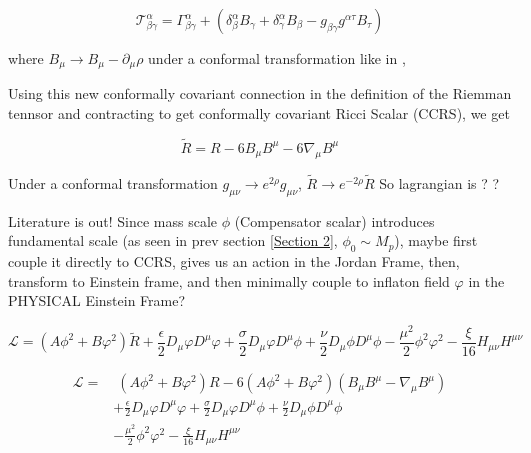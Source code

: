 \documentclass{article}
\begin{document}
\begin{equation}
    \mathcal{T}^{\alpha}_{\beta \gamma} = \Gamma^{\alpha}_{\beta \gamma} + (\delta^{\alpha}_{\beta} B_{\gamma} + \delta^{\alpha}_{\gamma} B_{\beta} - g_{\beta \gamma}g^{\alpha \tau}B_{\tau})
\end{equation}

where $B_{\mu} \rightarrow B_{\mu} - \partial_{\mu} \rho$ under a conformal transformation like in \cite{barker2024poincaregaugetheoryconformal}, 

Using this new conformally covariant connection in the definition of the Riemman tennsor and contracting to get conformally covariant Ricci Scalar (CCRS), we get 


\begin{equation}
    \tilde{R} = R - 6 B_{\mu} B^{\mu} - 6 \nabla_\mu B^\mu
\end{equation}

Under a conformal transformation $g_{\mu\nu} \rightarrow e^{2\rho}g_{\mu\nu}$, $\tilde{R} \rightarrow e^{-2\rho} \tilde{R}$
So lagrangian is ? ? 

Literature is out! Since mass scale $\phi$ (Compensator scalar) introduces fundamental scale (as seen in prev section \ref{Section 2}, $\phi_0 \sim M_p$), maybe first couple it directly to CCRS, gives us an action in the Jordan Frame, then, transform to Einstein frame, and then minimally couple to inflaton field $\varphi$ in the PHYSICAL Einstein Frame?

\begin{equation}
    \mathcal{L} = (A\phi^2 + B\varphi^2) \tilde{R} + \frac{\epsilon}{2} D_{\mu}\varphi D^{\mu}\varphi + \frac{\sigma}{2} D_{\mu}\varphi D^{\mu}\phi  +  \frac{\nu}{2} D_{\mu}\phi D^{\mu}\phi - \frac{\mu^2}{2} \phi^2 \varphi^2 - \frac{\xi}{16} H_{\mu\nu}H^{\mu\nu}
\end{equation}

\begin{equation}
    \begin{aligned}
        \mathcal{L} = &\; (A\phi^2 + B\varphi^2)R - 6(A\phi^2 + B\varphi^2)(B_{\mu} B^{\mu} - \nabla_\mu B^\mu) \\
        & +\frac{\epsilon}{2} D_{\mu}\varphi D^{\mu}\varphi + \frac{\sigma}{2} D_{\mu}\varphi D^{\mu}\phi + \frac{\nu}{2} D_{\mu}\phi D^{\mu}\phi \\
        & - \frac{\mu^2}{2} \phi^2 \varphi^2 - \frac{\xi}{16} H_{\mu\nu}H^{\mu\nu}
    \end{aligned}
\end{equation}
\end{document}
